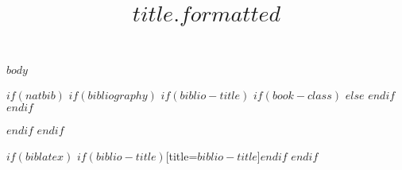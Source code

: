 \documentclass[article$if(classoption)$,$classoption$$endif$]{dp}
\title{$title.formatted$}
\begin{document}
$body$

$if(natbib)$
$if(bibliography)$
$if(biblio-title)$
$if(book-class)$
\renewcommand\bibname{$biblio-title$}
$else$
\renewcommand\refname{$biblio-title$}
$endif$
$endif$

$endif$
$endif$

$if(biblatex)$
\printbibliography$if(biblio-title)$[title=$biblio-title$]$endif$
$endif$
\end{document}
